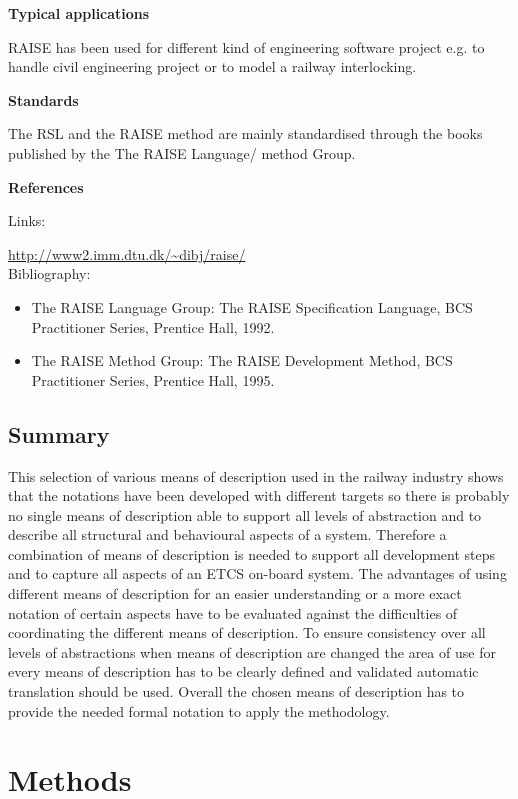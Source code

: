 \documentclass{./template/openetcs_report}
\begin{document}
	\textbf{Typical applications}

RAISE has been used for different kind of engineering software project e.g. to handle civil engineering project or to model a railway interlocking.

	\textbf{Standards}

The RSL and the RAISE method are mainly standardised through the books published by the The RAISE Language/ method Group.

	\textbf{References}

Links:

\url{http://www2.imm.dtu.dk/~dibj/raise/} \\[4pt]


Bibliography:

\begin{itemize}
\item The RAISE Language Group: The RAISE Specification Language, BCS Practitioner Series, Prentice Hall, 1992.
\item The RAISE Method Group: The RAISE Development Method, BCS Practitioner Series, Prentice Hall, 1995. 
\end{itemize}

\section{Summary}

This selection of various means of description used in the railway industry shows that the notations have been developed with different targets so there is probably no single means of description able to support all levels of abstraction and to describe all structural and behavioural aspects of a system. Therefore a combination of means of description is needed to support all development steps and to capture all aspects of an ETCS on-board system. The advantages of using different means of description for an easier understanding or a more exact notation of certain aspects have to be evaluated against the difficulties of coordinating the different means of description. To ensure consistency over all levels of abstractions when means of description are changed the area of use for every means of description has to be clearly defined and validated automatic translation should be used.  Overall the chosen means of description has to provide the needed formal notation to apply the methodology. 



\chapter{Methods}
\end{document}
